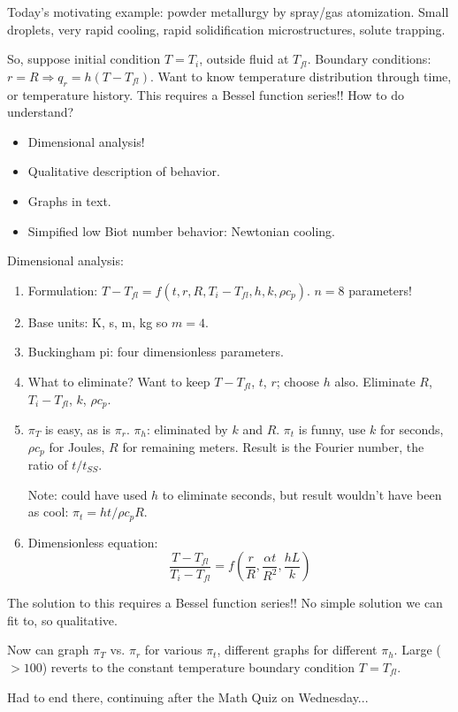 \documentclass{report}
\begin{document}
Today's motivating example: powder metallurgy by spray/gas atomization.  Small
droplets, very rapid cooling, rapid solidification microstructures, solute
trapping.

So, suppose initial condition $T=T_i$, outside fluid at $T_{fl}$.  Boundary
conditions: $r=R \Rightarrow q_r = h (T-T_{fl})$.  Want to know temperature
distribution through time, or temperature history.  This requires a Bessel
function series!!  How to do understand?
\begin{itemize}
\item Dimensional analysis!
\item Qualitative description of behavior.
\item Graphs in text.
\item Simpified low Biot number behavior: Newtonian cooling.
\end{itemize}

Dimensional analysis:
\begin{enumerate}
\item Formulation: $T-T_{fl} = f(t, r, R, T_i-T_{fl}, h, k, \rho c_p)$.  $n=8$
  parameters!
\item Base units: K, s, m, kg so $m=4$.
\item Buckingham pi: four dimensionless parameters.
\item What to eliminate?  Want to keep $T-T_{fl}$, $t$, $r$; choose $h$ also.
  Eliminate $R$, $T_i-T_{fl}$, $k$, $\rho c_p$.
\item $\pi_T$ is easy, as is $\pi_r$.  $\pi_h$: eliminated by $k$ and $R$.
  $\pi_t$ is funny, use $k$ for seconds, $\rho c_p$ for Joules, $R$ for
  remaining meters.  Result is the Fourier number, the ratio of $t/t_{SS}$.

  Note: could have used $h$ to eliminate seconds, but result wouldn't have been
  as cool: $\pi_t = ht/\rho c_p R$.
\item Dimensionless equation:
  $$\frac{T-T_{fl}}{T_i-T_{fl}} = f\left(\frac{r}{R}, \frac{\alpha t}{R^2},
    \frac{hL}{k}\right)$$
\end{enumerate}
The solution to this requires a Bessel function series!!  No simple solution we
can fit to, so qualitative.

Now can graph $\pi_T$ vs. $\pi_r$ for various $\pi_t$, different graphs for
different $\pi_h$.  Large ($>100$) reverts to the constant temperature boundary
condition $T=T_{fl}$.

Had to end there, continuing after the Math Quiz on Wednesday...
\newpage
\end{document}
